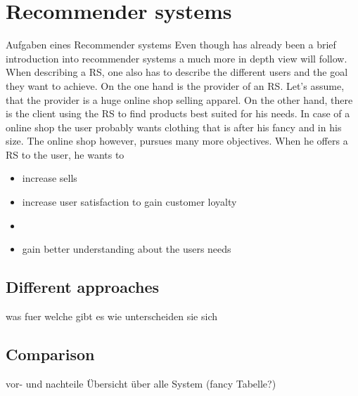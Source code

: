 

\section{Recommender systems}
Aufgaben eines Recommender systems
Even though has already been a brief introduction into recommender systems a much more in depth view will follow.
When describing a RS, one also has to describe the different users and the goal they want to achieve.
On the one hand is the provider of an RS.
Let's assume, that the provider is a huge online shop selling apparel.
On the other hand, there is the client using the RS to find products best suited for his needs.
In case of a online shop the user probably wants clothing that is after his fancy and in his size.
The online shop however, pursues many more objectives.
When he offers a RS to the user, he wants to
\begin{itemize}
    \item increase sells
    \item increase user satisfaction to gain customer loyalty
    \item
    \item gain better understanding about the users needs
\end{itemize}
\citep[4-5]{ricci:2011}



\subsection{Different approaches}
was fuer welche gibt es
wie unterscheiden sie sich

\subsection{Comparison}
vor- und nachteile
\"Ubersicht \"uber alle System (fancy Tabelle?)






